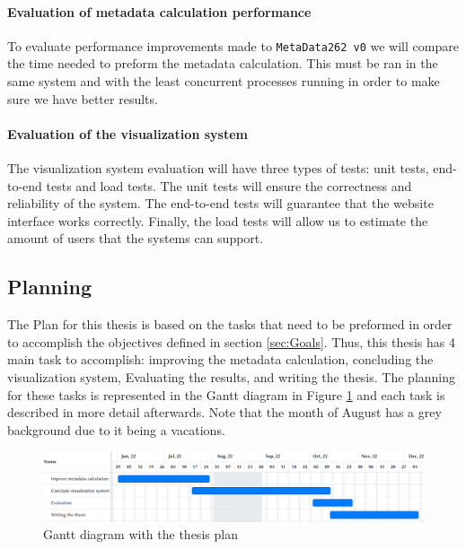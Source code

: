 \documentclass[runningheads]{llncs}
\begin{document}
\paragraph{Evaluation of metadata calculation performance}
To evaluate performance improvements made to \texttt{MetaData262 v0} we will compare the time needed to preform the metadata calculation. This must be ran in the same system and with the least concurrent processes running in order to make sure we have better results.

\paragraph{Evaluation of the visualization system}
The visualization system evaluation will have three types of tests: unit tests, end-to-end tests and load tests. The unit tests will ensure the correctness and reliability of the system. The end-to-end tests will guarantee that the website interface works correctly. Finally, the load tests will allow us to estimate the amount of users that the systems can support.


\subsection{Planning}
\label{sub:planning}


The Plan for this thesis is based on the tasks that need to be preformed in order to accomplish the objectives defined in section \ref{sec:Goals}. Thus, this thesis has 4 main task to accomplish: improving the metadata calculation, concluding the visualization system, Evaluating the results, and writing the thesis. The planning for these tasks is represented in the Gantt diagram in Figure \ref{fig:gantt} and each task is described in more detail afterwards. Note that the month of August has a grey background due to it being a vacations.

\begin{figure}[ht]
    \centering
    \includegraphics[width=1\textwidth]{images/gantt_thesis.png}
    \caption{Gantt diagram with the thesis plan}
    \label{fig:gantt}
\end{figure}
\end{document}
